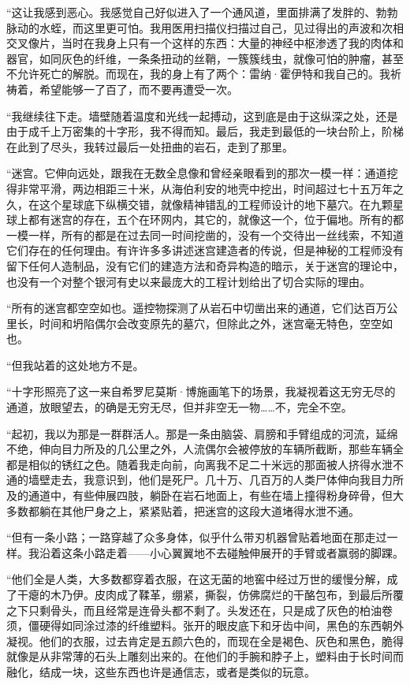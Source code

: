 \documentclass[AutoFakeBold=true]{book}
\begin{document}
``这让我感到恶心。我感觉自己好似进入了一个通风道，里面排满了发胖的、勃勃脉动的水蛭，而这里更可怕。我用医用扫描仪扫描过自己，见过得出的声波和次相交叉像片，当时在我身上只有一个这样的东西：大量的神经中枢渗透了我的肉体和器官，如同灰色的纤维，一条条扭动的丝鞘，一簇簇线虫，就像可怕的肿瘤，甚至不允许死亡的解脱。而现在，我的身上有了两个：雷纳·霍伊特和我自己的。我祈祷着，希望能够一了百了，而不要再遭受一次。

``我继续往下走。墙壁随着温度和光线一起搏动，这到底是由于这纵深之处，还是由于成千上万密集的十字形，我不得而知。最后，我走到最低的一块台阶上，阶梯在此到了尽头，我转过最后一处扭曲的岩石，走到了那里。

``迷宫。它伸向远处，跟我在无数全息像和曾经亲眼看到的那次一模一样：通道挖得非常平滑，两边相距三十米，从海伯利安的地壳中挖出，时间超过七十五万年之久，在这个星球底下纵横交错，就像精神错乱的工程师设计的地下墓穴。在九颗星球上都有迷宫的存在，五个在环网内，其它的，就像这一个，位于偏地。所有的都一模一样，所有的都是在过去同一时间挖凿的，没有一个交待出一丝线索，不知道它们存在的任何理由。有许许多多讲述迷宫建造者的传说，但是神秘的工程师没有留下任何人造制品，没有它们的建造方法和奇异构造的暗示，关于迷宫的理论中，也没有一个对整个银河有史以来最庞大的工程计划给出了切合实际的理由。

``所有的迷宫都空空如也。遥控物探测了从岩石中切凿出来的通道，它们达百万公里长，时间和坍陷偶尔会改变原先的墓穴，但除此之外，迷宫毫无特色，空空如也。

``但我站着的这处地方不是。

``十字形照亮了这一来自希罗尼莫斯·博施画笔下的场景，我凝视着这无穷无尽的通道，放眼望去，的确是无穷无尽，但并非空无一物……不，完全不空。

``起初，我以为那是一群群活人。那是一条由脑袋、肩膀和手臂组成的河流，延绵不绝，伸向目力所及的几公里之外，人流偶尔会被停放的车辆所截断，那些车辆全都是相似的锈红之色。随着我走向前，向离我不足二十米远的那面被人挤得水泄不通的墙壁走去，我意识到，他们是死尸。几十万、几百万的人类尸体伸向我目力所及的通道中，有些伸展四肢，躺卧在岩石地面上，有些在墙上撞得粉身碎骨，但大多数都躺在其他尸身之上，紧紧贴着，把迷宫的这段大道堵得水泄不通。

``但有一条小路；一路穿越了众多身体，似乎什么带刃机器曾贴着地面在那走过一样。我沿着这条小路走着——小心翼翼地不去碰触伸展开的手臂或者赢弱的脚踝。

``他们全是人类，大多数都穿着衣服，在这无菌的地窖中经过万世的缓慢分解，成了干瘪的木乃伊。皮肉成了鞣革，绷紧，撕裂，仿佛腐烂的干酪包布，到最后所覆之下只剩骨头，而且经常是连骨头都不剩了。头发还在，只是成了灰色的柏油卷须，僵硬得如同涂过漆的纤维塑料。张开的眼皮底下和牙齿中间，黑色的东西朝外凝视。他们的衣服，过去肯定是五颜六色的，而现在全是褐色、灰色和黑色，脆得就像是从非常薄的石头上雕刻出来的。在他们的手腕和脖子上，塑料由于长时间而融化，结成一块，这些东西也许是通信志，或者是类似的玩意。
\end{document}
